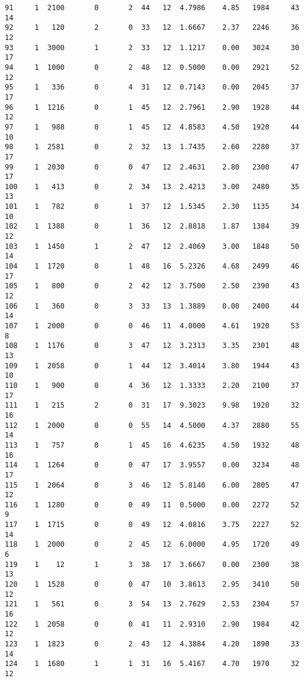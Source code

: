 \documentclass[
  letterpaper,
  DIV=11,
  numbers=noendperiod]{scrreprt}
\begin{document}
\begin{verbatim}
91     1  2100       0       2  44   12  4.7986    4.85   1984     43      14
92     1   120       2       0  33   12  1.6667    2.37   2246     36      12
93     1  3000       1       2  33   12  1.1217    0.00   3024     30      17
94     1  1000       0       2  48   12  0.5000    0.00   2921     52      12
95     1   336       0       4  31   12  0.7143    0.00   2045     37      17
96     1  1216       0       1  45   12  2.7961    2.90   1928     44      12
97     1   988       0       1  45   12  4.8583    4.50   1920     44      10
98     1  2581       0       2  32   13  1.7435    2.60   2280     37      17
99     1  2030       0       0  47   12  2.4631    2.80   2300     47      17
100    1   413       0       2  34   13  2.4213    3.00   2480     35      13
101    1   782       0       1  37   12  1.5345    2.30   1135     34      10
102    1  1388       0       1  36   12  2.8818    1.87   1384     39      12
103    1  1450       1       2  47   12  2.4069    3.00   1848     50      14
104    1  1720       0       1  48   16  5.2326    4.68   2499     46      17
105    1   800       0       2  42   12  3.7500    2.50   2390     43      12
106    1   360       0       3  33   13  1.3889    0.00   2400     44      14
107    1  2000       0       0  46   11  4.0000    4.61   1920     53       8
108    1  1176       0       3  47   12  3.2313    3.35   2301     48      13
109    1  2058       0       1  44   12  3.4014    3.80   1944     43      10
110    1   900       0       4  36   12  1.3333    2.20   2100     37      17
111    1   215       2       0  31   17  9.3023    9.98   1920     32      16
112    1  2000       0       0  55   14  4.5000    4.37   2880     55      14
113    1   757       0       1  45   16  4.6235    4.50   1932     48      16
114    1  1264       0       0  47   17  3.9557    0.00   3234     48      17
115    1  2064       0       3  46   12  5.8140    6.00   2805     47      12
116    1  1280       0       0  49   11  0.5000    0.00   2272     52       9
117    1  1715       0       0  49   12  4.0816    3.75   2227     52      14
118    1  2000       0       2  45   12  6.0000    4.95   1720     49       6
119    1    12       1       3  38   17  3.6667    0.00   2300     38      13
120    1  1528       0       0  47   10  3.8613    2.95   3410     50      12
121    1   561       0       3  54   13  2.7629    2.53   2304     57      16
122    1  2058       0       0  41   11  2.9310    2.90   1984     42      12
123    1  1823       0       2  43   12  4.3884    4.20   1890     33      14
124    1  1680       1       1  31   16  5.4167    4.70   1970     32      12

\end{verbatim}
\end{document}
